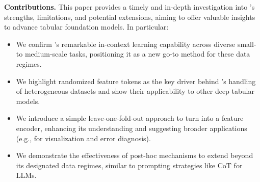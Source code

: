 \textbf{Contributions.}
This paper provides a timely and in-depth investigation into \ours's strengths, limitations, and potential extensions, aiming to offer valuable insights to advance tabular foundation models. In particular:
\begin{itemize}[nosep, topsep=2pt, parsep=2pt, partopsep=2pt, leftmargin=*]
\item We confirm \ours's remarkable in-context learning capability across diverse small- to medium-scale tasks, positioning it as a new go-to method for these data regimes.
\item We highlight randomized feature tokens as the key driver behind \ours's handling of heterogeneous datasets and show their applicability to other deep tabular models.
\item We introduce a simple leave-one-fold-out approach to turn \ours into a feature encoder, enhancing its understanding and suggesting broader applications (e.g., for visualization and error diagnosis).
\item We demonstrate the effectiveness of post-hoc mechanisms to extend \ours beyond its designated data regimes, similar to prompting strategies like CoT for LLMs.
\end{itemize}

